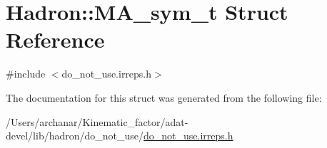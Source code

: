 \hypertarget{structHadron_1_1MA__sym__t}{}\section{Hadron\+:\+:M\+A\+\_\+sym\+\_\+t Struct Reference}
\label{structHadron_1_1MA__sym__t}


{\ttfamily \#include $<$do\+\_\+not\+\_\+use.\+irreps.\+h$>$}



The documentation for this struct was generated from the following file\+:\begin{DoxyCompactItemize}
\item 
/\+Users/archanar/\+Kinematic\+\_\+factor/adat-\/devel/lib/hadron/do\+\_\+not\+\_\+use/\mbox{\hyperlink{adat-devel_2lib_2hadron_2do__not__use_2do__not__use_8irreps_8h}{do\+\_\+not\+\_\+use.\+irreps.\+h}}\end{DoxyCompactItemize}
